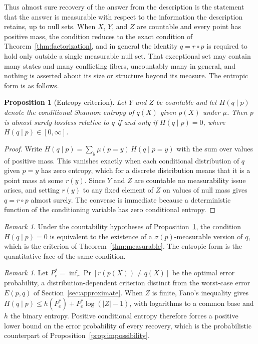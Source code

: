\documentclass[11pt]{article}
\newtheorem{proposition}[theorem]{Proposition}
\theoremstyle{definition}
\theoremstyle{remark}
\newtheorem{remark}[theorem]{Remark}
\begin{document}
Thus almost sure recovery of the answer from the description is the statement that the answer is measurable with respect to the information the description retains, up to null sets. When $X$, $Y$, and $Z$ are countable and every point has positive mass, the condition reduces to the exact condition of Theorem~\ref{thm:factorization}, and in general the identity $q=r\circ p$ is required to hold only outside a single measurable null set. That exceptional set may contain many states and many conflicting fibers, uncountably many in general, and nothing is asserted about its size or structure beyond its measure. The entropic form is as follows.

\begin{proposition}[Entropy criterion]\label{prop:entropy}
Let $Y$ and $Z$ be countable and let $H(q\mid p)$ denote the conditional Shannon entropy of $q(X)$ given $p(X)$ under $\mu$. Then $p$ is almost surely lossless relative to $q$ if and only if $H(q\mid p)=0$, where $H(q\mid p)\in[0,\infty]$.
\end{proposition}

\begin{proof}
Write $H(q\mid p)=\sum_{y}\mu(p=y)\,H(q\mid p=y)$ with the sum over values of positive mass. This vanishes exactly when each conditional distribution of $q$ given $p=y$ has zero entropy, which for a discrete distribution means that it is a point mass at some $r(y)$. Since $Y$ and $Z$ are countable no measurability issue arises, and setting $r(y)$ to any fixed element of $Z$ on values of null mass gives $q=r\circ p$ almost surely. The converse is immediate because a deterministic function of the conditioning variable has zero conditional entropy.
\end{proof}

\begin{remark}
Under the countability hypotheses of Proposition~\ref{prop:entropy}, the condition $H(q\mid p)=0$ is equivalent to the existence of a $\sigma(p)$-measurable version of $q$, which is the criterion of Theorem~\ref{thm:measurable}. The entropic form is the quantitative face of the same condition.
\end{remark}

\begin{remark}
Let $P_e^*=\inf_r\Pr[r(p(X))\ne q(X)]$ be the optimal error probability, a distribution-dependent criterion distinct from the worst-case error $E(p,q)$ of Section~\ref{sec:approximate}. When $Z$ is finite, Fano's inequality \cite{cover} gives $H(q\mid p)\le h(P_e^*)+P_e^*\log(|Z|-1)$, with logarithms to a common base and $h$ the binary entropy. Positive conditional entropy therefore forces a positive lower bound on the error probability of every recovery, which is the probabilistic counterpart of Proposition~\ref{prop:impossibility}.
\end{remark}
\end{document}

